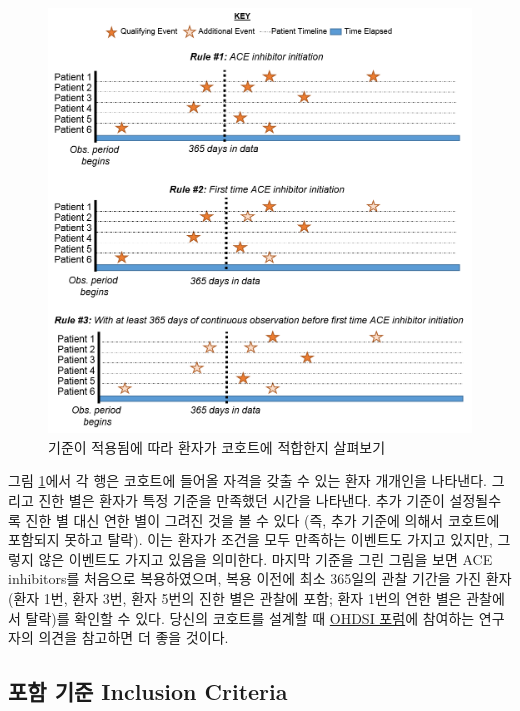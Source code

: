 \documentclass[10.5pt]{book}
\theoremstyle{definition}
\theoremstyle{definition}
\theoremstyle{definition}
\theoremstyle{remark}
\begin{document}
\begin{figure}

{\centering \includegraphics[width=1\linewidth]{images/Cohorts/EarliestEventExplained} 

}

\caption{기준이 적용됨에 따라 환자가 코호트에 적합한지 살펴보기}\label{fig:EarliestEventExplained}
\end{figure}

그림 \ref{fig:EarliestEventExplained}에서 각 행은 코호트에 들어올 자격을
갖출 수 있는 환자 개개인을 나타낸다. 그리고 진한 별은 환자가 특정 기준을
만족했던 시간을 나타낸다. 추가 기준이 설정될수록 진한 별 대신 연한 별이
그려진 것을 볼 수 있다 (즉, 추가 기준에 의해서 코호트에 포함되지 못하고
탈락). 이는 환자가 조건을 모두 만족하는 이벤트도 가지고 있지만, 그렇지
않은 이벤트도 가지고 있음을 의미한다. 마지막 기준을 그린 그림을 보면 ACE
inhibitors를 처음으로 복용하였으며, 복용 이전에 최소 365일의 관찰 기간을
가진 환자 (환자 1번, 환자 3번, 환자 5번의 진한 별은 관찰에 포함; 환자
1번의 연한 별은 관찰에서 탈락)를 확인할 수 있다. 당신의 코호트를 설계할
때 \href{http://forums.ohdsi.org}{OHDSI 포럼}에 참여하는 연구자의 의견을
참고하면 더 좋을 것이다.

\subsection{포함 기준 Inclusion Criteria}\label{--inclusion-criteria}
\end{document}
